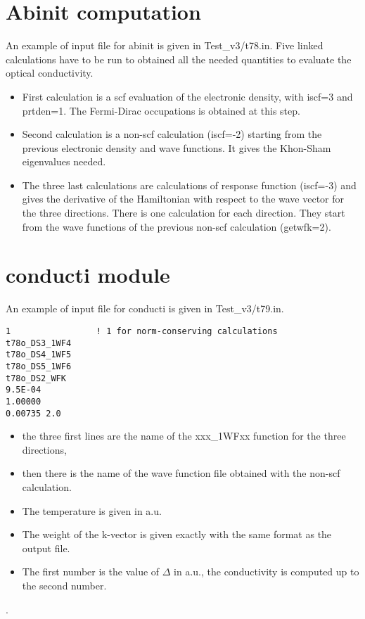 \documentclass[a4,12pts]{article}
\begin{document}
  


\section{Abinit computation}
An example of input file for abinit is given in Test\_v3/t78.in. Five linked
calculations have to be run to obtained all the needed quantities to evaluate 
the optical conductivity.
\begin{itemize}
\item First calculation is a scf evaluation of the electronic density, with iscf=3 and 
prtden=1. The Fermi-Dirac occupations is obtained at this step.
\item Second calculation is a non-scf calculation (iscf=-2) starting from the previous electronic density
and wave functions. It gives the Khon-Sham eigenvalues needed.
\item The three last calculations are calculations of response function (iscf=-3) and
gives the derivative of the Hamiltonian with respect to the wave vector
for the three directions. There is one calculation for each direction. 
They start from the wave functions of the previous non-scf calculation (getwfk=2).

\end{itemize}


\section{conducti module}
An example of input file for conducti is given in Test\_v3/t79.in.
\begin{verbatim}
1                 ! 1 for norm-conserving calculations
t78o_DS3_1WF4
t78o_DS4_1WF5
t78o_DS5_1WF6
t78o_DS2_WFK
9.5E-04
1.00000
0.00735 2.0
\end{verbatim}

\begin {itemize}
\item the three first lines are the name of the xxx\_1WFxx function for the three directions,
\item  then there is the
name of the wave function file obtained with the non-scf calculation.
\item The temperature is given in a.u.
\item The weight of the k-vector is given exactly with the same format as the output file.
\item The first number is the value of $\Delta$ in a.u., the conductivity is computed up to the second number.
\end{itemize}.
\end{document}
